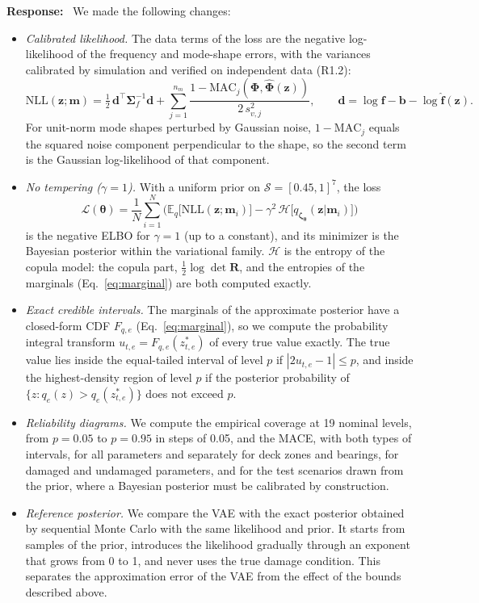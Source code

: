 \documentclass[11pt]{article}
\newenvironment{response}{\par\smallskip\noindent\color{resp}\textbf{Response:}\ }{\par}
\newcommand{\m}{\mathbf{m}}
\newcommand{\z}{\mathbf{z}}
\newcommand{\f}{\mathbf{f}}
\begin{document}
\begin{response}
We made the following changes:
\begin{itemize}[leftmargin=*]
\item \emph{Calibrated likelihood.} The data terms of the loss are the negative log-likelihood of the frequency and
mode-shape errors, with the variances calibrated by simulation and verified on independent data (R1.2):
\begin{equation}
\mathrm{NLL}(\z;\m)=\tfrac12\,\mathbf{d}^{\top}\bm{\Sigma}_f^{-1}\mathbf{d}
+\sum_{j=1}^{n_m}\frac{1-\mathrm{MAC}_j(\bm{\Phi},\hat{\bm{\Phi}}(\z))}{2\,s_{v,j}^2},\qquad
\mathbf{d}=\log\f-\mathbf{b}-\log\hat{\f}(\z).
\label{eq:nll}
\end{equation}
For unit-norm mode shapes perturbed by Gaussian noise, $1-\mathrm{MAC}_j$ equals the squared noise component
perpendicular to the shape, so the second term is the Gaussian log-likelihood of that component.
\item \emph{No tempering ($\gamma=1$).} With a uniform prior on $\mathcal{S}=[0.45,1]^7$, the loss
\begin{equation}
\mathcal{L}(\bm\theta)=\frac1N\sum_{i=1}^N\Big(\mathbb{E}_{q}\big[\mathrm{NLL}(\z;\m_i)\big]
-\gamma^2\,\mathcal{H}\big[q_{\bm\zeta_{\bm\theta}}(\z|\m_i)\big]\Big)
\label{eq:loss}
\end{equation}
is the negative ELBO for $\gamma=1$ (up to a constant), and its minimizer is the Bayesian posterior within the
variational family. $\mathcal{H}$ is the entropy of the copula model: the copula part, $\frac12\log\det\mathbf{R}$, and
the entropies of the marginals (Eq.~\eqref{eq:marginal}) are both computed exactly.
\item \emph{Exact credible intervals.} The marginals of the approximate posterior have a closed-form CDF $F_{q,e}$
(Eq.~\eqref{eq:marginal}), so we compute the probability integral transform $u_{t,e}=F_{q,e}(z^*_{t,e})$ of every true
value exactly. The true value lies inside the equal-tailed interval of level $p$ if $|2u_{t,e}-1|\le p$, and inside the
highest-density region of level $p$ if the posterior probability of $\{z: q_e(z)>q_e(z^*_{t,e})\}$ does not exceed $p$.
\item \emph{Reliability diagrams.} We compute the empirical coverage at 19 nominal levels, from $p=0.05$ to $p=0.95$ in
steps of 0.05, and the MACE, with both types of intervals, for all parameters and separately for deck zones and bearings, for damaged and
undamaged parameters, and for the test scenarios drawn from the prior, where a Bayesian posterior must be calibrated by
construction.
\item \emph{Reference posterior.} We compare the VAE with the exact posterior obtained by sequential Monte Carlo with
the same likelihood and prior. It starts from samples of the prior, introduces the likelihood gradually through an
exponent that grows from 0 to 1, and never uses the true damage condition. This separates the approximation error of
the VAE from the effect of the bounds described above.
\end{itemize}


\end{response}
\end{document}
